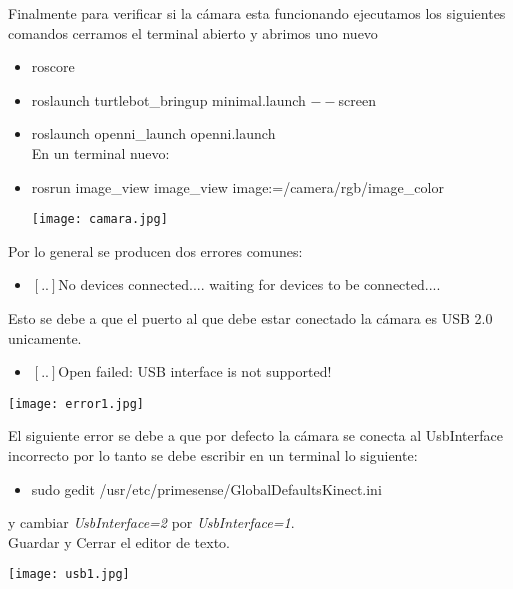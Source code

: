 \documentclass[12pt,a4paper]{article}
\begin{document}
\begin{itemize}
\begin{itemize}
\end{itemize}
Finalmente para verificar si la cámara esta funcionando ejecutamos los siguientes comandos cerramos el terminal abierto y abrimos uno nuevo\\
\begin{itemize}
\item roscore
\item roslaunch turtlebot\_bringup minimal.launch $--$screen
\item roslaunch openni\_launch openni.launch\\
En un terminal nuevo:
\item rosrun image\_view image\_view image:=/camera/rgb/image\_color
\begin{center}
\texttt{[image: camara.jpg]}
\end{center}
\end{itemize}
Por lo general se producen dos errores comunes:
\begin{itemize}
\item $[..]$No devices connected.... waiting for devices to be connected....
\end{itemize}
Esto se debe a que el puerto al que debe estar conectado la cámara es USB 2.0 unicamente.
\begin{itemize}
\item $[..]$Open failed: USB interface is not supported!
\end{itemize}
\begin{center}
\texttt{[image: error1.jpg]}
\end{center}
El siguiente error se debe a que por defecto la cámara se conecta al UsbInterface incorrecto por lo tanto se debe escribir en un terminal lo siguiente:
\begin{itemize}
\item sudo gedit /usr/etc/primesense/GlobalDefaultsKinect.ini
\end{itemize}
y cambiar \textit{UsbInterface=2} por \textit{UsbInterface=1}.\\
Guardar y Cerrar el editor de texto.\\
\begin{center}
\texttt{[image: usb1.jpg]}
\end{center}

\end{itemize}
\end{document}
